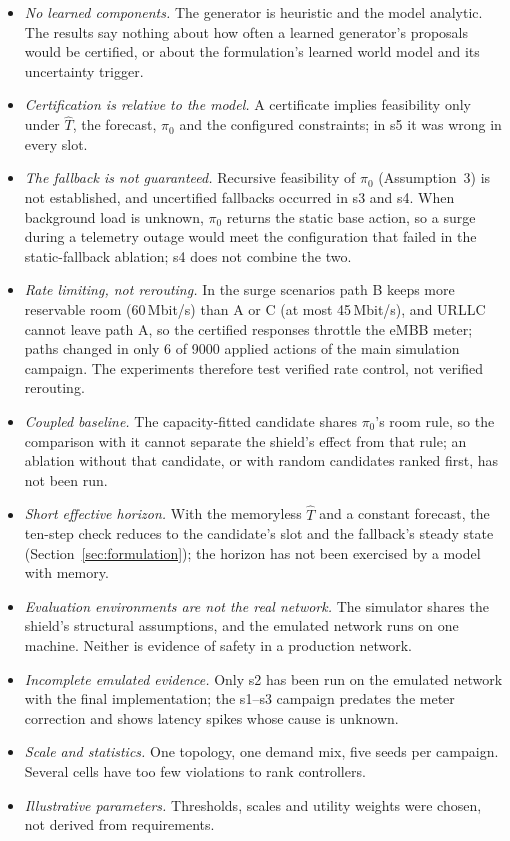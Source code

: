 \documentclass[conference]{IEEEtran}
\newcommand{\That}{\hat{T}}
\begin{document}
\begin{itemize}
\item \emph{No learned components.} The generator is heuristic and the model
analytic. The results say nothing about how often a learned generator's proposals
would be certified, or about the formulation's learned world model and its
uncertainty trigger.
\item \emph{Certification is relative to the model.} A certificate implies
feasibility only under $\That$, the forecast, $\pi_0$ and the configured
constraints; in s5 it was wrong in every slot.
\item \emph{The fallback is not guaranteed.} Recursive feasibility of $\pi_0$
(Assumption~3) is not established, and uncertified fallbacks occurred in s3 and s4.
When background load is unknown, $\pi_0$ returns the static base action, so a surge
during a telemetry outage would meet the configuration that failed in the
static-fallback ablation; s4 does not combine the two.
\item \emph{Rate limiting, not rerouting.} In the surge scenarios path B keeps more
reservable room (60\,Mbit/s) than A or C (at most 45\,Mbit/s), and URLLC cannot leave
path A, so the certified responses throttle the eMBB meter; paths changed in only 6 of
9000 applied actions of the main simulation campaign. The experiments therefore
test verified rate control, not verified rerouting.
\item \emph{Coupled baseline.} The capacity-fitted candidate shares $\pi_0$'s room
rule, so the comparison with it cannot separate the shield's effect from that rule;
an ablation without that candidate, or with random candidates ranked first, has not
been run.
\item \emph{Short effective horizon.} With the memoryless $\That$ and a constant
forecast, the ten-step check reduces to the candidate's slot and the fallback's
steady state (Section~\ref{sec:formulation}); the horizon has not been exercised by a
model with memory.
\item \emph{Evaluation environments are not the real network.} The simulator shares
the shield's structural assumptions, and the emulated network runs on one machine.
Neither is evidence of safety in a production network.
\item \emph{Incomplete emulated evidence.} Only s2 has been run on the emulated
network with the final implementation; the s1--s3 campaign predates the meter
correction and shows latency spikes whose cause is unknown.
\item \emph{Scale and statistics.} One topology, one demand mix, five seeds per
campaign. Several cells have too few violations to rank controllers.
\item \emph{Illustrative parameters.} Thresholds, scales and utility weights were
chosen, not derived from requirements.
\end{itemize}
\end{document}
